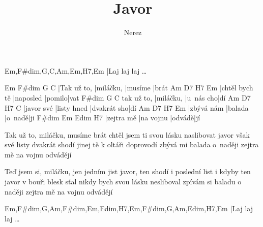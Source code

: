 \documentclass{song}
\author{Nerez}
\title{Javor}
\begin{document}
\strophe
Em,F\#dim,G,C,Am,Em,H7,Em
|Laj laj laj \ldots
\endstrophe

\strophe
Em          F\#dim    G       C
|Tak už to, |miláčku, |musíme |brát
Am             D7        H7    Em
|chtěl bych tě |naposled |pomilo|vat
           F\#dim    G         C
tak už to, |miláčku, |u~nás cho|dí
Am         D7          H7         C
|javor své |listy hned |dvakrát sho|dí
Am         D7      H7    Em
|zbývá nám |balada |o~nadě|ji
F\#dim     Em        Edim   H7
|zejtra mě |na vojnu |odvádě|jí
\endstrophe

\strophe*
Tak už to, miláčku, musíme brát
chtěl jsem ti svou lásku naslibovat
javor však své listy dvakrát shodí
jinej tě k oltáři doprovodí
zbývá mi balada o~naději
zejtra mě na vojnu odvádějí
\endstrophe

\strophe*
Teď jsem si, miláčku, jen jedním jist
javor, ten shodí i poslední list
i kdyby ten javor v bouři blesk sťal
nikdy bych svou lásku nesliboval
zpívám si baladu o naději
zejtra mě na vojnu odvádějí
\endstrophe

\strophe
Em,F\#dim,G,Am,F\#dim,Em,Edim,H7,Em,F\#dim,G,Am,Edim,H7,Em
|Laj laj laj \ldots
\endstrophe
\end{document}

